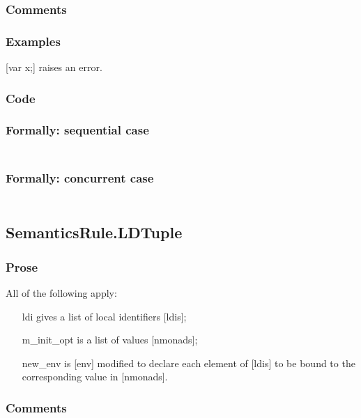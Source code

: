 \documentclass{book}
\begin{document}
    \subsubsection{Comments}

    \subsubsection{Examples}
    [var x;] raises an error.

  \subsubsection{Code}

  \subsubsection{Formally: sequential case}
  \begin{align}
  \end{align} 

  \subsubsection{Formally: concurrent case}
  \begin{align}
  \end{align} 

\subsection{SemanticsRule.LDTuple \label{sec:SemanticsRule.LDTuple}}

    \subsubsection{Prose}
    All of the following apply:
    \begin{itemize}
    \item [ldi] gives a list of local identifiers [ldis];
    \item [m\_init\_opt] is a list of values [nmonads];
    \item [new\_env] is [env] modified to declare each element of [ldis] to be bound
      to the corresponding value in [nmonads].
    \end{itemize}

    \subsubsection{Comments}
\end{document}
